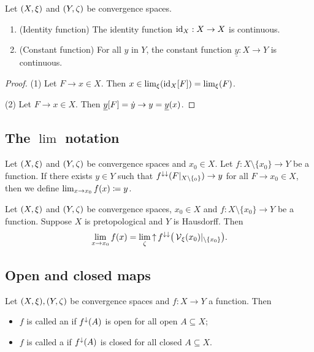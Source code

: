 \begin{lemma} \label{continuityConstructions}
Let $\sSet{X,\xi}$ and $\sSet{Y,\zeta}$ be convergence spaces.
\begin{enumerate}
\item \textup{(Identity function)} The identity function $\operatorname{id}_X:X\to X$ is continuous.
\item \textup{(Constant function)} For all $y$ in $Y$, the constant function $\underline{y}: X \to Y$ is continuous.
\end{enumerate}
\end{lemma}
\begin{proof}
(1) Let $F\to x \in X$. Then $x\in \lim_\xi(\operatorname{id}_X[F]) = \lim_\xi(F)$.

(2) Let $F\to x \in X$. Then $\underline{y}[F] = \dot{y} \to y = \underline{y}(x)$.
\end{proof}


\subsection{The $\lim$ notation}
\begin{definition}
Let $\sSet{X,\xi}$ and $\sSet{Y,\zeta}$ be convergence spaces and $x_0\in X$. Let $f: X\setminus\{x_0\}\to Y$ be a function. If there exists $y\in Y$ such that $f^{\downarrow\downarrow}(F|_{X\setminus \{_0\}}) \to y$ for all $F\to x_0 \in X$, then we define $\lim_{x\to x_0}f(x) \coloneqq y$.
\end{definition}

\begin{lemma}
Let $\sSet{X,\xi}$ and $\sSet{Y,\zeta}$ be convergence spaces, $x_0\in X$ and $f: X\setminus\{x_0\}\to Y$ be a function. Suppose $X$ is pretopological and $Y$ is Hausdorff. Then
\[ \lim_{x\to x_0}f(x) = \lim_{\zeta} \operatorname{\uparrow} f^{\downarrow\downarrow}\big(\operatorname{\mathcal{V}}_\xi(x_0)|_{\setminus\{x_0\} }\big). \] 
\end{lemma}

\subsection{Open and closed maps}
\begin{definition}
Let $\sSet{X, \xi}, \sSet{Y, \zeta}$ be convergence spaces and $f: X\to Y$ a function. Then
\begin{itemize}
\item $f$ is called an  if $f^\downarrow(A)$ is open for all open $A\subseteq X$;
\item $f$ is called a  if $f^\downarrow(A)$ is closed for all closed $A\subseteq X$.
\end{itemize}
\end{definition}

